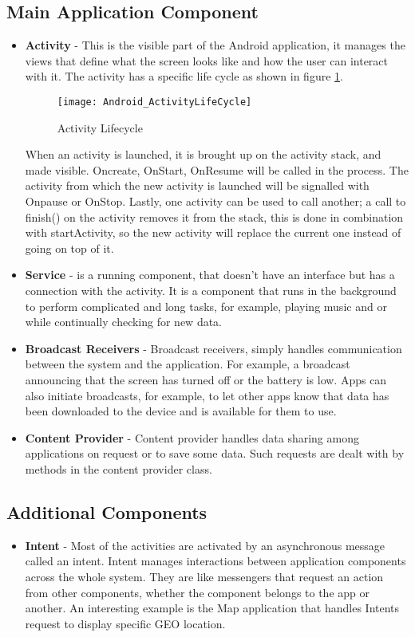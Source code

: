 \begin{appendices}
\subsection{Main Application Component}
\begin{itemize}
	\item \textbf{Activity} - 
	This is the visible part of the Android application, it manages the views that define what the screen looks like and how the user can interact with it. The activity has a specific life cycle as shown in figure \ref{fig:lifecycle}.
	\begin{figure}[h]
		\centering
		\texttt{[image: Android\_ActivityLifeCycle]}
		\caption{Activity Lifecycle}
		\label{fig:lifecycle}
	\end{figure}
	When an activity is launched, it is brought up on the activity stack, and made visible. Oncreate, OnStart, OnResume will be called in the process. The activity from which the new activity is launched will be signalled with Onpause or OnStop. Lastly, one activity can be used to call another; a call to finish() on the  activity removes it from the stack, this is done in combination with startActivity, so the new activity will replace the current one instead of going on top of it.
	
	\item  \textbf{Service} -
	is a running component, that doesn't have an interface but has a connection with the activity. It is a component that runs in the background to perform complicated and long tasks, for example, playing music and or while continually checking for new data. 
	
	\item  \textbf{Broadcast Receivers} -
	Broadcast receivers, simply handles communication between the system and the application. For example, a broadcast announcing that the screen has turned off or the battery is low. Apps can also initiate broadcasts, for example, to let other apps know that data has been downloaded to the device and is available for them to use.
	
	\item \textbf{Content Provider} - 
	Content provider handles data sharing among applications on request or to save some data. Such requests are dealt with by methods in the content provider class.
	
\end{itemize}

\subsection{Additional Components}
\label{additional_components}
\begin{itemize}
	\item \textbf {Intent} - Most of the activities are activated by an asynchronous message called an intent.
	Intent manages interactions between application components across the whole system. They are like messengers that request an action from other components, whether the component belongs to the app or another. An interesting example is the Map application that handles Intents request to display specific GEO location. 
	

\end{itemize}
\end{appendices}
